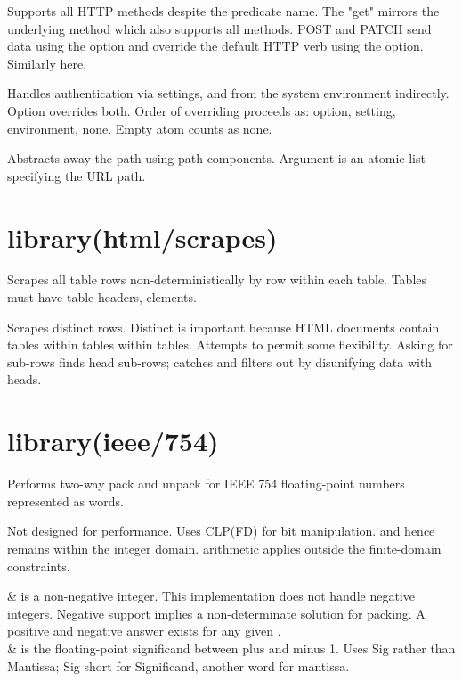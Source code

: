 \begin{description}
Supports all HTTP methods despite the predicate name. The "get"
mirrors the underlying  method which also supports all
methods. POST and PATCH send data using the  option and
override the default HTTP verb using the  option.
Similarly here.

Handles authentication via settings, and from the system environment
indirectly. Option  overrides both. Order of
overriding proceeds as: option, setting, environment, none. Empty
atom counts as none.

Abstracts away the path using path components. Argument
 is an atomic list specifying the URL path.
\end{description}

\chapter{library(html/scrapes)}\label{sec:scrapes}

\begin{description}
Scrapes all table rows non-deterministically by row within each
table. Tables must have table headers,  elements.

Scrapes distinct rows. Distinct is important because HTML documents
contain tables within tables within tables. Attempts to permit some
flexibility. Asking for sub-rows finds head sub-rows; catches and
filters out by disunifying data with heads.
\end{description}

\chapter{library(ieee/754)}\label{sec:754}

\begin{description}
\nodescription
Performs two-way pack and unpack for IEEE 754 floating-point numbers
represented as words.

Not designed for performance. Uses CLP(FD) for bit manipulation. and
hence remains within the integer domain.  arithmetic applies
outside the finite-domain constraints.

\begin{arguments}
 & is a non-negative integer. This implementation does not
handle negative integers. Negative support implies a non-determinate
solution for packing. A positive and negative answer exists for any
given . \\
 & is the floating-point significand between plus and minus 1.
Uses Sig rather than Mantissa; Sig short for Significand, another
word for mantissa. \\
\end{arguments}
\end{description}

